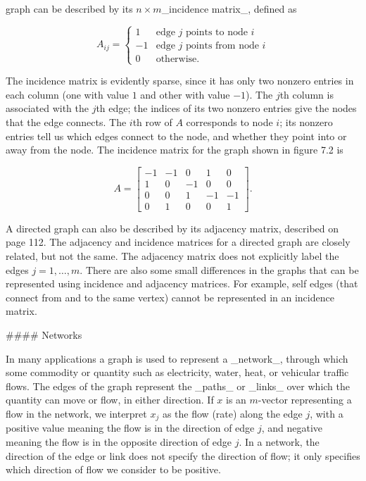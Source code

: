 graph can be described by its \(n\times m\)_incidence matrix_, defined as

\[A_{ij}=\left\{\begin{array}{rl}1&\text{edge $j$ points to node $i$}\\ -1&\text{edge $j$ points from node $i$}\\ 0&\text{otherwise.}\end{array}\right.\]

The incidence matrix is evidently sparse, since it has only two nonzero entries in each column (one with value \(1\) and other with value \(-1\)). The \(j\)th column is associated with the \(j\)th edge; the indices of its two nonzero entries give the nodes that the edge connects. The \(i\)th row of \(A\) corresponds to node \(i\); its nonzero entries tell us which edges connect to the node, and whether they point into or away from the node. The incidence matrix for the graph shown in figure 7.2 is

\[A=\left[\begin{array}{rrrrr}-1&-1&0&1&0\\ 1&0&-1&0&0\\ 0&0&1&-1&-1\\ 0&1&0&0&1\end{array}\right].\]

A directed graph can also be described by its adjacency matrix, described on page 112. The adjacency and incidence matrices for a directed graph are closely related, but not the same. The adjacency matrix does not explicitly label the edges \(j=1,\ldots,m\). There are also some small differences in the graphs that can be represented using incidence and adjacency matrices. For example, self edges (that connect from and to the same vertex) cannot be represented in an incidence matrix.

#### Networks

In many applications a graph is used to represent a _network_, through which some commodity or quantity such as electricity, water, heat, or vehicular traffic flows. The edges of the graph represent the _paths_ or _links_ over which the quantity can move or flow, in either direction. If \(x\) is an \(m\)-vector representing a flow in the network, we interpret \(x_{j}\) as the flow (rate) along the edge \(j\), with a positive value meaning the flow is in the direction of edge \(j\), and negative meaning the flow is in the opposite direction of edge \(j\). In a network, the direction of the edge or link does not specify the direction of flow; it only specifies which direction of flow we consider to be positive.

